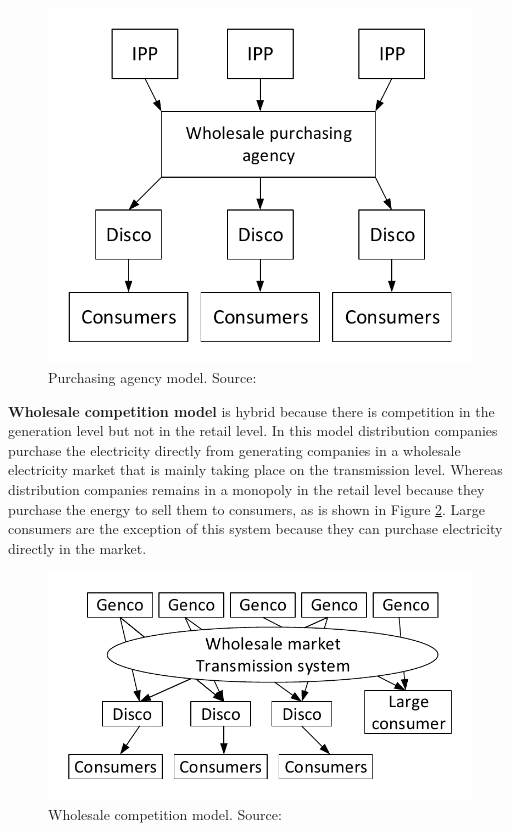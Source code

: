 \documentclass[a4paper,11pt,twoside,openright]{report}
\begin{document}
\begin{figure}[h!]
	\centering
	\includegraphics[scale=0.7]{Visios/Market_competition_Purchasing_agency}
	\caption{Purchasing agency  model. Source: \cite{Economics_Kirschen}}
	\label{fig:purchasing}
\end{figure}

\textbf{Wholesale competition model} is hybrid because there is competition in the generation level but not in the retail level. In this model distribution companies purchase the electricity directly from generating companies in a wholesale electricity market that is mainly taking place on the transmission level. Whereas distribution companies remains in a monopoly in the retail level because they purchase the energy to sell them to consumers, as is shown in Figure \ref{fig:wholesale}. Large consumers are the exception of this system because they can purchase electricity directly in the market.

\begin{figure}[h!]
	\centering
	\includegraphics[scale=0.7]{Visios/Market_competition_Wholesale_competition}
	\caption{Wholesale competition model. Source: \cite{Economics_Kirschen}}
	\label{fig:wholesale}
\end{figure}
\end{document}
